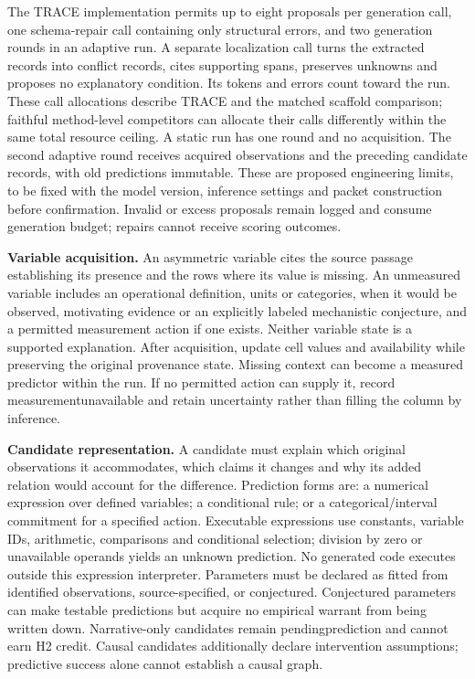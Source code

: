 \documentclass[11pt,a4paper]{article}
\newcommand{\CNSIdentifier}[1]{{\small\ttfamily\def\_{\textunderscore\allowbreak}#1}}
\begin{document}
The TRACE implementation permits up to eight proposals per generation
call, one schema-repair call containing only structural errors, and two
generation rounds in an adaptive run. A separate localization call turns
the extracted records into conflict records, cites supporting spans,
preserves unknowns and proposes no explanatory condition. Its tokens and
errors count toward the run. These call allocations describe TRACE and
the matched scaffold comparison; faithful method-level competitors can
allocate their calls differently within the same total resource ceiling.
A static run has one round and no acquisition. The second adaptive round
receives acquired observations and the preceding candidate records, with
old predictions immutable. These are proposed engineering limits, to be
fixed with the model version, inference settings and packet construction
before confirmation. Invalid or excess proposals remain logged and
consume generation budget; repairs cannot receive scoring outcomes.

\textbf{Variable acquisition.} An asymmetric variable cites the source
passage establishing its presence and the rows where its value is
missing. An unmeasured variable includes an operational definition,
units or categories, when it would be observed, motivating evidence or
an explicitly labeled mechanistic conjecture, and a permitted
measurement action if one exists. Neither variable state is a supported
explanation. After acquisition, update cell values and availability
while preserving the original provenance state. Missing context can
become a measured predictor within the run. If no permitted action can
supply it, record \CNSIdentifier{measurement\_unavailable} and retain
uncertainty rather than filling the column by inference.

\textbf{Candidate representation.} A candidate must explain which
original observations it accommodates, which claims it changes and why
its added relation would account for the difference. Prediction forms
are: a numerical expression over defined variables; a conditional rule;
or a categorical/interval commitment for a specified action. Executable
expressions use constants, variable IDs, arithmetic, comparisons and
conditional selection; division by zero or unavailable operands yields
an unknown prediction. No generated code executes outside this
expression interpreter. Parameters must be declared as fitted from
identified observations, source-specified, or conjectured. Conjectured
parameters can make testable predictions but acquire no empirical
warrant from being written down. Narrative-only candidates remain
\CNSIdentifier{pending\_prediction} and cannot earn H2 credit. Causal
candidates additionally declare intervention assumptions; predictive
success alone cannot establish a causal graph.
\end{document}
